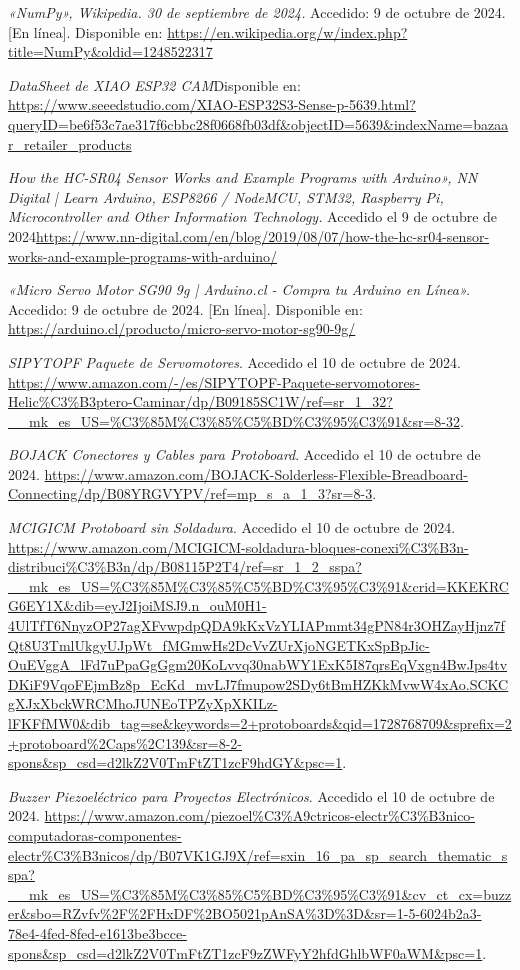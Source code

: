 \begin{thebibliography}{99}
    \textit{«NumPy», Wikipedia. 30 de septiembre de 2024.} Accedido: 9 de octubre de 2024. [En línea]. Disponible en: \url{https://en.wikipedia.org/w/index.php?title=NumPy&oldid=1248522317}

    \textit{DataSheet de XIAO ESP32 CAM}Disponible en: \url{https://www.seeedstudio.com/XIAO-ESP32S3-Sense-p-5639.html?queryID=be6f53c7ae317f6cbbc28f0668fb03df&objectID=5639&indexName=bazaar_retailer_products}
            
    \textit{How the HC-SR04 Sensor Works and Example Programs with Arduino», NN Digital | Learn Arduino, ESP8266 / NodeMCU, STM32, Raspberry Pi, Microcontroller and Other Information Technology.} Accedido el 9 de octubre de 2024\url{https://www.nn-digital.com/en/blog/2019/08/07/how-the-hc-sr04-sensor-works-and-example-programs-with-arduino/}

    \textit{«Micro Servo Motor SG90 9g | Arduino.cl - Compra tu Arduino en Línea».} Accedido: 9 de octubre de 2024. [En línea]. Disponible en: \url{https://arduino.cl/producto/micro-servo-motor-sg90-9g/}

    \textit{SIPYTOPF Paquete de Servomotores}. Accedido el 10 de octubre de 2024. \url{https://www.amazon.com/-/es/SIPYTOPF-Paquete-servomotores-Helic%C3%B3ptero-Caminar/dp/B09185SC1W/ref=sr_1_32?__mk_es_US=%C3%85M%C3%85%C5%BD%C3%95%C3%91&sr=8-32}.

    \textit{BOJACK Conectores y Cables para Protoboard}. Accedido el 10 de octubre de 2024. \url{https://www.amazon.com/BOJACK-Solderless-Flexible-Breadboard-Connecting/dp/B08YRGVYPV/ref=mp_s_a_1_3?sr=8-3}.

    \textit{MCIGICM Protoboard sin Soldadura}. Accedido el 10 de octubre de 2024. \url{https://www.amazon.com/MCIGICM-soldadura-bloques-conexi%C3%B3n-distribuci%C3%B3n/dp/B08115P2T4/ref=sr_1_2_sspa?__mk_es_US=%C3%85M%C3%85%C5%BD%C3%95%C3%91&crid=KKEKRCG6EY1X&dib=eyJ2IjoiMSJ9.n_ouM0H1-4UlTfT6NnyzOP27agXFvwpdpQDA9kKxVzYLIAPmmt34gPN84r3OHZayHjnz7fQt8U3TmlUkgyUJpWt_fMGmwHs2DcVvZUrXjoNGETKxSpBpJic-OuEVggA_lFd7uPpaGgGgm20KoLvvq30nabWY1ExK5I87qrsEqVxgn4BwJps4tvDKiF9VqoFEjmBz8p_EcKd_mvLJ7fmupow2SDy6tBmHZKkMvwW4xAo.SCKCgXJxXbckWRCMhoJUNEoTPZyXpXKILz-lFKFfMW0&dib_tag=se&keywords=2+protoboards&qid=1728768709&sprefix=2+protoboard%2Caps%2C139&sr=8-2-spons&sp_csd=d2lkZ2V0TmFtZT1zcF9hdGY&psc=1}.

    \textit{Buzzer Piezoeléctrico para Proyectos Electrónicos}. Accedido el 10 de octubre de 2024. \url{https://www.amazon.com/piezoel%C3%A9ctricos-electr%C3%B3nico-computadoras-componentes-electr%C3%B3nicos/dp/B07VK1GJ9X/ref=sxin_16_pa_sp_search_thematic_sspa?__mk_es_US=%C3%85M%C3%85%C5%BD%C3%95%C3%91&cv_ct_cx=buzzer&sbo=RZvfv%2F%2FHxDF%2BO5021pAnSA%3D%3D&sr=1-5-6024b2a3-78e4-4fed-8fed-e1613be3bcce-spons&sp_csd=d2lkZ2V0TmFtZT1zcF9zZWFyY2hfdGhlbWF0aWM&psc=1}.


\end{thebibliography}
